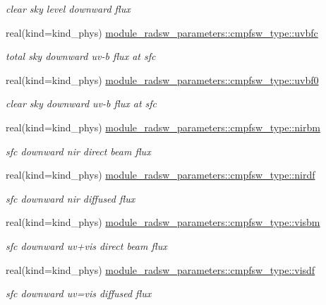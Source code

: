 \begin{DoxyCompactItemize}
\begin{DoxyCompactList}\small\item\em clear sky level downward flux \end{DoxyCompactList}\item 
real(kind=kind\+\_\+phys) \hyperlink{group__module__radsw__main_ga7b0ac40e0ceb2ce82b6b95a614542b4f}{module\+\_\+radsw\+\_\+parameters\+::cmpfsw\+\_\+type\+::uvbfc}
\begin{DoxyCompactList}\small\item\em total sky downward uv-\/b flux at sfc \end{DoxyCompactList}\item 
real(kind=kind\+\_\+phys) \hyperlink{group__module__radsw__main_ga9e9e74c17ad3aa0a1c280f1eae513b22}{module\+\_\+radsw\+\_\+parameters\+::cmpfsw\+\_\+type\+::uvbf0}
\begin{DoxyCompactList}\small\item\em clear sky downward uv-\/b flux at sfc \end{DoxyCompactList}\item 
real(kind=kind\+\_\+phys) \hyperlink{group__module__radsw__main_gaae8070f9f477bf036071ccc7d707693d}{module\+\_\+radsw\+\_\+parameters\+::cmpfsw\+\_\+type\+::nirbm}
\begin{DoxyCompactList}\small\item\em sfc downward nir direct beam flux \end{DoxyCompactList}\item 
real(kind=kind\+\_\+phys) \hyperlink{group__module__radsw__main_ga9944f87ce40eb678e3ca1d88b1dbb797}{module\+\_\+radsw\+\_\+parameters\+::cmpfsw\+\_\+type\+::nirdf}
\begin{DoxyCompactList}\small\item\em sfc downward nir diffused flux \end{DoxyCompactList}\item 
real(kind=kind\+\_\+phys) \hyperlink{group__module__radsw__main_gaabfae10580f53c63900c74261b1b219c}{module\+\_\+radsw\+\_\+parameters\+::cmpfsw\+\_\+type\+::visbm}
\begin{DoxyCompactList}\small\item\em sfc downward uv+vis direct beam flux \end{DoxyCompactList}\item 
real(kind=kind\+\_\+phys) \hyperlink{group__module__radsw__main_ga3eb91eab30abc0f1f1bb05c5447cede5}{module\+\_\+radsw\+\_\+parameters\+::cmpfsw\+\_\+type\+::visdf}
\begin{DoxyCompactList}\small\item\em sfc downward uv=vis diffused flux \end{DoxyCompactList}\item 

\end{DoxyCompactItemize}
